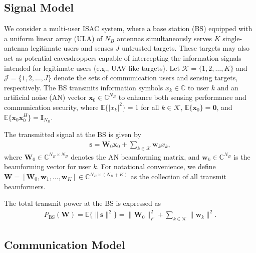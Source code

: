 \documentclass[runningheads]{llncs}
\begin{document}
\subsection{Signal Model}
We consider a multi-user ISAC system, where a base station (BS) equipped with a uniform linear array (ULA) of $N_B$ antennas simultaneously serves $K$ single-antenna legitimate users and senses $J$ untrusted targets. These targets may also act as potential eavesdroppers capable of intercepting the information signals intended for legitimate users (e.g., UAV-like targets).
Let $\mathcal{K} = \{1,2,\dots,K\}$ and $\mathcal{J} = \{1,2,\dots,J\}$ denote the sets of communication users and sensing targets, respectively. The BS transmits information symbols $x_k \in \mathbb{C}$ to user $k$ and an artificial noise (AN) vector $\mathbf{x}_0 \in \mathbb{C}^{N_B}$ to enhance both sensing performance and communication security, where $\mathbb{E}\{|x_k|^2\} = 1$ for all $k \in \mathcal{K}$, $\mathbb{E}\{\mathbf{x}_0\} = \mathbf{0}$, and $\mathbb{E}\{\mathbf{x}_0 \mathbf{x}_0^H \} = \mathbf{I}_{N_B}$.

The transmitted signal at the BS is given by
\begin{align} 
\mathbf{s} = \mathbf{W}_0 \mathbf{x}_0 + \sum_{k \in \mathcal{K}} \mathbf{w}_k x_k,
\end{align}
where $\mathbf{W}_0 \in \mathbb{C}^{N_B \times N_B}$ denotes the AN beamforming matrix, and $\mathbf{w}_k \in \mathbb{C}^{N_B}$ is the beamforming vector for user $k$. For notational convenience, we define $\mathbf{W} = [\mathbf{W}_0, \mathbf{w}_1, \dots, \mathbf{w}_K] \in \mathbb{C}^{N_B \times (N_B + K)}$ as the collection of all transmit beamformers.

The total transmit power at the BS is expressed as
\begin{align}
P_{\mathrm{BS}}(\mathbf{W})= \mathbb{E} \{ \|\mathbf{s} \|^2 \} = \|\mathbf{W}_0\|_F^2 + \sum_{k \in \mathcal{K}} \|\mathbf{w}_k\|^2.
\end{align}
\subsection{Communication Model}
\end{document}
